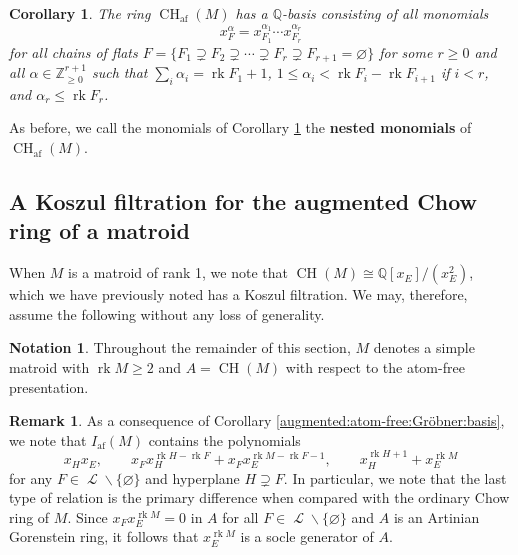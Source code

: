 \documentclass[11pt, reqno]{amsart}
\DeclareMathOperator{\aChow}{CH}             		%
\DeclareMathOperator{\atomfree}{af}
\newcommand{\af}{{\atomfree}}
\renewcommand{\emptyset}{\varnothing}
\newcommand{\iso}{\cong}
\DeclareMathOperator{\LL}{\mathcal{L}}
\newcommand{\QQ}{\mathbb{Q}}
\DeclareMathOperator{\rk}{rk}
\renewcommand{\setminus}{\smallsetminus}
\newcommand{\term}[1]{\textbf{\textsf{#1}}}
\newcommand{\ZZ}{\mathbb{Z}}
\newtheorem{cor}[thm]{Corollary}
\theoremstyle{definition}
\newtheorem{rmk}[thm]{Remark}
\newtheorem*{notation}{Notation}
\numberwithin{equation}{section}
\numberwithin{table}{section}
\begin{document}
\begin{spacing}{1.1}
\begin{cor} \label{augmented:monomial:basis}
The ring $\aChow_\af(M)$ has a $\QQ$-basis consisting of all monomials
\[ x_F^\alpha = x_{F_1}^{\alpha_1} \cdots x_{F_r}^{\alpha_r} \]
for all chains of flats $F = \{F_1 \supsetneq F_2 \supsetneq \cdots \supsetneq F_r \supsetneq F_{r+1} = \emptyset \}$ for some $r \geq 0$ and all $\alpha \in \ZZ_{\geq 0}^{r+1}$ such that $\sum_i \alpha_i = \rk F_1 + 1$, $1 \leq \alpha_i < \rk F_i - \rk F_{i + 1}$ if $i < r$, and $\alpha_r \leq \rk F_r$.
\end{cor}

\noindent As before, we call the monomials of Corollary \ref{augmented:monomial:basis} the \term{nested monomials} of $\aChow_{\mathrm{af}}(M)$.

\subsection{A Koszul filtration for the augmented Chow ring of a matroid}\label{SSfilt2}

When $M$ is a matroid of rank 1, we note that $\aChow(M) \iso \QQ[x_E]/(x_E^2)$, which we have previously noted has a Koszul filtration.  We may, therefore, assume the following without any loss of generality.


\begin{notation}
Throughout the remainder of this section, $M$ denotes a simple matroid with $\rk M \geq 2$ and $A = \aChow(M)$ with respect to the atom-free presentation.
\end{notation}

\begin{rmk} \label{augmented:socle:generator}
As a consequence of Corollary \ref{augmented:atom-free:Gröbner:basis}, we note that $I_{\mathrm{af}}(M)$ contains the polynomials
\begin{equation} \label{augmented:hyperplane:relations}
x_Hx_E, \qquad x_Fx_H^{\rk H - \rk F} + x_Fx_E^{\rk M - \rk F - 1}, \qquad x_H^{\rk H +1} + x_E^{\rk M}
\end{equation}
for any $F \in \LL \setminus \{\emptyset\}$ and hyperplane $H \supsetneq F$.  In particular, we note that the last type of relation is the primary difference when compared with the ordinary Chow ring of $M$.  Since $x_Fx_E^{\rk M} = 0$ in $A$ for all $F \in \LL \setminus \{\emptyset\}$ and $A$ is an Artinian Gorenstein ring, it follows that $x_E^{\rk M}$ is a socle generator of $A$.
\end{rmk}


\end{spacing}
\end{document}
